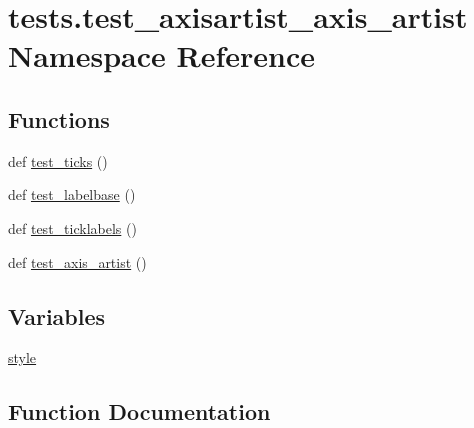 \hypertarget{namespacetests_1_1test__axisartist__axis__artist}{}\section{tests.\+test\+\_\+axisartist\+\_\+axis\+\_\+artist Namespace Reference}
\label{namespacetests_1_1test__axisartist__axis__artist}
\subsection*{Functions}
\begin{DoxyCompactItemize}
\item 
def \hyperlink{namespacetests_1_1test__axisartist__axis__artist_af84cfd5863c2d06126c983b37d9c015e}{test\+\_\+ticks} ()
\item 
def \hyperlink{namespacetests_1_1test__axisartist__axis__artist_a23e795ffe33fc5ecb8d73bdcd566c1fc}{test\+\_\+labelbase} ()
\item 
def \hyperlink{namespacetests_1_1test__axisartist__axis__artist_ab7cbfed25b10f04d74233e08ca68d813}{test\+\_\+ticklabels} ()
\item 
def \hyperlink{namespacetests_1_1test__axisartist__axis__artist_a766436947c86d0421d60ab805df6e638}{test\+\_\+axis\+\_\+artist} ()
\end{DoxyCompactItemize}
\subsection*{Variables}
\begin{DoxyCompactItemize}
\item 
\hyperlink{namespacetests_1_1test__axisartist__axis__artist_a9ed691141b8405107a68f5b60c5748a5}{style}
\end{DoxyCompactItemize}


\subsection{Function Documentation}
\mbox{\label{namespacetests_1_1test__axisartist__axis__artist_a766436947c86d0421d60ab805df6e638}} 
